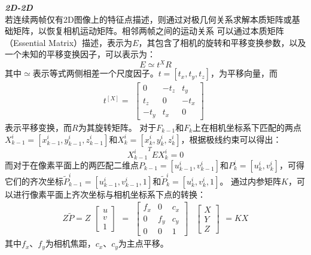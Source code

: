 \emph{\textbf{2D-2D}}\\
    若连续两帧仅有2D图像上的特征点描述，则通过对极几何关系求解本质矩阵或基础矩阵，以恢复相机运动矩阵。相邻两帧之间的运动关系
    可以通过本质矩阵（Essential Matrix）描述，表示为$E$，其包含了相机的旋转和平移变换参数，以及一个未知的平移变换因子，可以表示为：
    $$E\simeq t^{X}R$$
    其中$\simeq$表示等式两侧相差一个尺度因子。$t=\left[t_{x},t_{y},t_{z}\right]$，为平移向量，而
    $$
    t^[X]=
    \begin{gathered}
    \begin{bmatrix} 0 & -t_{z} & t_{y} \\ t_{z} & 0 & -t_{x} \\ -t_{y} & t_{x} & 0 \end{bmatrix}
    \end{gathered}
    $$
    表示平移变换，而$R$为其旋转矩阵。
    对于$F_{k-1}$和$F_{k}$上在相机坐标系下匹配的两点$X_{k-1}^{i}=\left[x_{k-1}^{i},y_{k-1}^{i},z_{k-1}^{i}\right]$和$X_{k}^{i}=\left[x_{k}^{i},y_{k}^{i},z_{k}^{i}\right]$，根据极线约束可以得出：
    $${X_{k-1}^{i}}^{T}EX_{k}^{i}=0$$
    而对于在像素平面上的两匹配二维点$P_{k-1}=\left[u_{k-1}^{i},v_{k-1}^{i} \right]$和$P_{k}^{i}=\left[u_{k}^{i},v_{k}^{i}\right]$，可得它们的齐次坐标${\widetilde P_{k-1}^{i}}=\left[u_{k-1}^{i},v_{k-1}^{i},1 \right]$和${\widetilde P_{k}^{i}}=\left[u_{k}^{i},v_{k}^{i},1 \right]$。
    通过内参矩阵$K$，可以进行像素平面上齐次坐标与相机坐标系下点的转换：
    $$
    Z{\widetilde P}
    =
    Z
    \begin{gathered}
    \begin{bmatrix} u \\ v \\ 1 \end{bmatrix}
    \end{gathered}
    =
    \begin{gathered}
    \begin{bmatrix} f_{x} & 0 & c_{x} \\ 0 & f_{y} & c_{y} \\ 0 & 0 & 1 \end{bmatrix}
    \end{gathered}
    \begin{gathered}
    \begin{bmatrix} X \\ Y \\ Z \end{bmatrix}
    \end{gathered}
    =
    KX
    $$
    其中$f_{x}$、$f_{y}$为相机焦距，$c_{x}$、$c_{y}$为主点平移。
    
